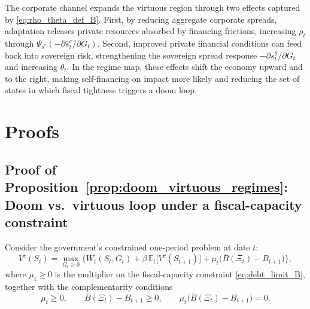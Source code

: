 \documentclass[12pt]{article}
\begin{document}
The corporate channel expands the virtuous region through two effects captured by \eqref{eq:rho_theta_def_B}.
First, by reducing aggregate corporate spreads, adaptation releases private resources absorbed by financing frictions, increasing
$\rho_t$ through $\Psi_{\bar s^c}(-\partial \bar s^c_t/\partial G_t)$. Second, improved private financial conditions can feed back into
sovereign risk, strengthening the sovereign spread response $-\partial s^g_t/\partial G_t$ and increasing $\theta_t$.
In the regime map, these effects shift the economy upward and to the right, making self-financing on impact more likely and reducing the
set of states in which fiscal tightness triggers a doom loop.





\setcounter{table}{0}
\setcounter{figure}{0}
\renewcommand{\thetable}{\arabic{table}}
\renewcommand{\thefigure}{\arabic{figure}}


\clearpage





\clearpage
\appendix
\setcounter{equation}{0}
\renewcommand{\theequation}{A.\arabic{equation}}
\setcounter{figure}{0}
\renewcommand{\thefigure}{A.\arabic{figure}}
\section{Proofs}

\subsection{Proof of Proposition~\ref{prop:doom_virtuous_regimes}: Doom vs.\ virtuous loop under a fiscal-capacity constraint}

Consider the government's constrained one-period problem at date $t$:
\begin{equation}
  V^c(S_t)
  =
  \max_{G_t\ge 0}
  \Big\{
    W_t(S_t,G_t)
    + \beta\,\mathbb{E}_t\big[V^c(S_{t+1})\big]
    + \mu_t\big(\overline B(\Xi_t)-B_{t+1}\big)
  \Big\},
  \label{eq:app_constrained_problem}
\end{equation}
where $\mu_t\ge 0$ is the multiplier on the fiscal-capacity constraint \eqref{eq:debt_limit_B}, together with the complementarity
conditions
\begin{equation}
  \mu_t\ge 0,
  \qquad
  \overline B(\Xi_t)-B_{t+1}\ge 0,
  \qquad
  \mu_t\big(\overline B(\Xi_t)-B_{t+1}\big)=0.
  \label{eq:app_complementarity}
\end{equation}
\end{document}
